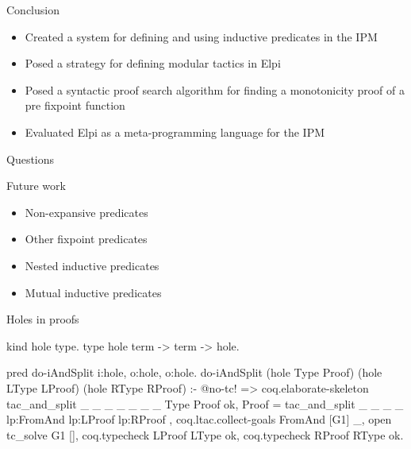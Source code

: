 \documentclass[aspectratio=169]{beamer}
\begin{document}
\begin{frame}{Conclusion}
    \begin{itemize}[<+->]
        \item Created a system for defining and using inductive predicates in the IPM
        \item Posed a strategy for defining modular tactics in Elpi
        \item Posed a syntactic proof search algorithm for finding a monotonicity proof of a pre fixpoint function
        \item Evaluated Elpi as a meta-programming language for the IPM
    \end{itemize}
\end{frame}

\appendix

\begin{frame}
    \begin{center}
        \LARGE {} Questions
    \end{center}
\end{frame}

\begin{frame}{Future work}
    \begin{itemize}
        \item Non-expansive predicates
        \item Other fixpoint predicates
        \item Nested inductive predicates
        \item Mutual inductive predicates
    \end{itemize}
\end{frame}

\begin{frame}[fragile]{Holes in proofs}
    \begin{elpicode}
        kind hole type.
        type hole term -> term -> hole.
        
        pred do-iAndSplit i:hole, o:hole, o:hole.
        do-iAndSplit (hole Type Proof) (hole LType LProof) 
                     (hole RType RProof) :-
          @no-tc! => coq.elaborate-skeleton 
                        {{ tac_and_split _ _ _ _ _ _ _ }} 
                        Type Proof ok,
          Proof = {{ tac_and_split _ _ _ _ 
                                   lp:FromAnd lp:LProof lp:RProof }},
          coq.ltac.collect-goals FromAnd [G1] _,
          open tc_solve G1 [],
          coq.typecheck LProof LType ok,
          coq.typecheck RProof RType ok.
    \end{elpicode}
\end{frame}
\end{document}
